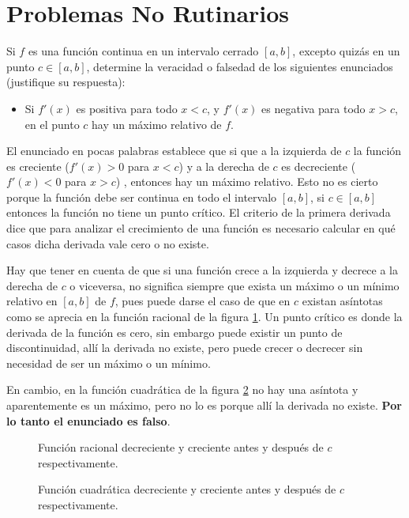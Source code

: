 \section{Problemas No Rutinarios}

Si \(f\) es una función continua en un intervalo cerrado \([a, b]\), excepto quizás en un punto \(c\in[a,b]\), determine la veracidad o falsedad de los siguientes enunciados (justifique su respuesta):

\begin{itemize}
    \item Si \(f'(x)\) es positiva para todo \(x<c\), y \(f'(x)\) es negativa para todo \(x>c\), en el punto \(c\) hay un máximo relativo de \(f\).
\end{itemize}

El enunciado en pocas palabras establece que si que a la izquierda de $c$ la función es creciente  ($f'(x) > 0$ para $x < c$) y a la derecha de $c$ es decreciente  ($f'(x) < 0$ para $x > c$) , entonces hay un máximo relativo. Esto no es cierto porque la función debe ser continua en todo el intervalo $[a, b]$, si $c \in [a, b]$ entonces la función no tiene un punto crítico. El criterio de la primera derivada dice que para analizar el crecimiento de una función es necesario calcular en qué casos dicha derivada vale cero o no existe.

Hay que tener en cuenta de que si una función crece a la izquierda y decrece a la derecha de $c$ o viceversa, no significa siempre que exista un máximo o un mínimo relativo en $[a, b]$ de $f$, pues puede darse el caso de que en $c$ existan asíntotas como se aprecia en la función racional de la figura \ref{fig:racional1}. Un punto crítico es donde la derivada de la función es cero, sin embargo puede existir un punto de discontinuidad, allí la derivada no existe, pero puede crecer o decrecer sin necesidad de ser un máximo o un mínimo.

En cambio, en la función cuadrática de la figura \ref{fig:cuadratica1} no hay una asíntota y aparentemente es un máximo, pero no lo es porque allí la derivada no existe. \textbf{Por lo tanto el enunciado es falso}.

\begin{figure}[H]
    \centering
    
    \caption{Función racional decreciente y creciente antes y después de $c$ respectivamente.}
    \label{fig:racional1}
\end{figure}

\begin{figure}[H]
    \centering
    
    \caption{Función cuadrática decreciente y creciente antes y después de $c$ respectivamente.}
    \label{fig:cuadratica1}
\end{figure}

